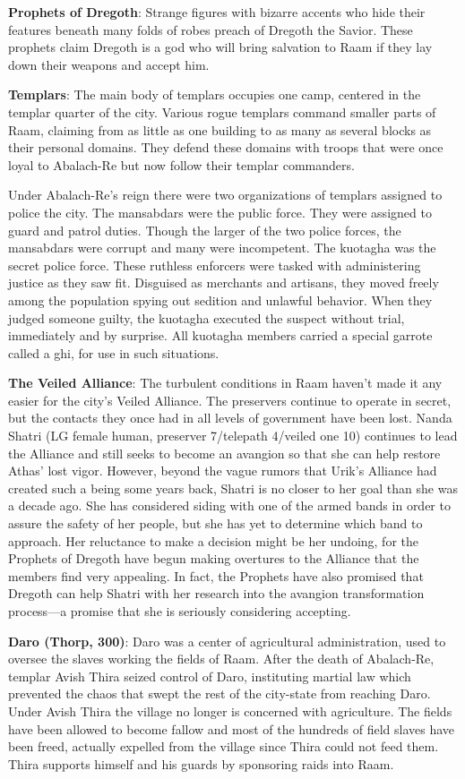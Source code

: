 {	\textbf{Prophets of Dregoth}: Strange figures with bizarre accents who hide their features beneath many folds of robes preach of Dregoth the Savior. These prophets claim Dregoth is a god who will bring salvation to Raam if they lay down their weapons and accept him.

	\textbf{Templars}: The main body of templars occupies one camp, centered in the templar quarter of the city. Various rogue templars command smaller parts of Raam, claiming from as little as one building to as many as several blocks as their personal domains. They defend these domains with troops that were once loyal to Abalach-Re but now follow their templar commanders.

	Under Abalach-Re's reign there were two organizations of templars assigned to police the city. The mansabdars were the public force. They were assigned to guard and patrol duties. Though the larger of the two police forces, the mansabdars were corrupt and many were incompetent. The kuotagha was the secret police force. These ruthless enforcers were tasked with administering justice as they saw fit. Disguised as merchants and artisans, they moved freely among the population spying out sedition and unlawful behavior. When they judged someone guilty, the kuotagha executed the suspect without trial, immediately and by surprise. All kuotagha members carried a special garrote called a ghi, for use in such situations.

	\textbf{The Veiled Alliance}: The turbulent conditions in Raam haven't made it any easier for the city's Veiled Alliance. The preservers continue to operate in secret, but the contacts they once had in all levels of government have been lost. Nanda Shatri (LG female human, preserver 7/telepath 4/veiled one 10) continues to lead the Alliance and still seeks to become an avangion so that she can help restore Athas' lost vigor. However, beyond the vague rumors that Urik's Alliance had created such a being some years back, Shatri is no closer to her goal than she was a decade ago. She has considered siding with one of the armed bands in order to assure the safety of her people, but she has yet to determine which band to approach. Her reluctance to make a decision might be her undoing, for the Prophets of Dregoth have begun making overtures to the Alliance that the members find very appealing. In fact, the Prophets have also promised that Dregoth can help Shatri with her research into the avangion transformation process---a promise that she is seriously considering accepting.
}
{
	\textbf{Daro (Thorp, 300)}: Daro was a center of agricultural administration, used to oversee the slaves working the fields of Raam. After the death of Abalach-Re, templar Avish Thira seized control of Daro, instituting martial law which prevented the chaos that swept the rest of the city-state from reaching Daro. Under Avish Thira the village no longer is concerned with agriculture. The fields have been allowed to become fallow and most of the hundreds of field slaves have been freed, actually expelled from the village since Thira could not feed them. Thira supports himself and his guards by sponsoring raids into Raam.
}
